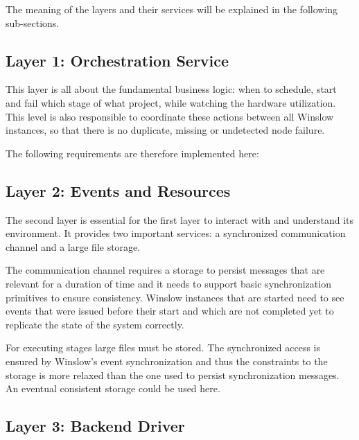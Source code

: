 The meaning of the layers and their services will be explained in the following sub-sections.

\subsection{Layer 1: Orchestration Service}
\label{analysis:layer_1}

This layer is all about the fundamental business logic: when to schedule, start and fail which stage of what project, while watching the hardware utilization.
This level is also responsible to coordinate these actions between all Winslow instances, so that there is no duplicate, missing or undetected node failure.

The following requirements are therefore implemented here: 

\subsection{Layer 2: Events and Resources}
\label{analysis:layer_2}

The second layer is essential for the first layer to interact with and understand its environment.
It provides two important services: a synchronized communication channel and a large file storage.

The communication channel requires a storage to persist messages that are relevant for a duration of time and it needs to  support basic synchronization primitives to ensure consistency.
Winslow instances that are started need to see events that were issued before their start and which are not completed yet to replicate the state of the system correctly.

For executing stages large files must be stored.
The synchronized access is ensured by Winslow's event synchronization and thus the constraints to the storage is more relaxed than the one used to persist synchronization messages.
An eventual consistent storage could be used here. 


\subsection{Layer 3: Backend Driver}
\label{analysis:layer_3}


